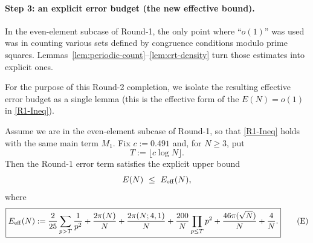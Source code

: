 \paragraph{Step 3: an explicit error budget (the new effective bound).}
In the even-element subcase of Round-1, the only point where ``$o(1)$'' was used was in counting various sets defined by congruence conditions modulo prime squares.  Lemmas~\ref{lem:periodic-count}--\ref{lem:crt-density} turn those estimates into explicit ones.

\medskip
\noindent For the purpose of this Round-2 completion, we isolate the resulting effective error budget as a single lemma (this is the effective form of the $E(N)=o(1)$ in \eqref{R1-Ineq}).

\begin{lemma}\label{lem:effective-error}
Assume we are in the even-element subcase of Round-1, so that \eqref{R1-Ineq} holds with the same main term $M_1$.
Fix $c:=0.491$ and, for $N\ge 3$, put
\[
T:=\lfloor c\log N\rfloor.
\]
Then the Round-1 error term satisfies the explicit upper bound
\[
E(N)\ \le\ E_{\rm eff}(N),
\]
where
\[
\boxed{
E_{\rm eff}(N):=
\frac{2}{25}\sum_{p>T}\frac{1}{p^2}
+\frac{2\pi(N)}{N}
+\frac{2\pi(N;4,1)}{N}
+\frac{200}{N}\prod_{p\le T}p^2
+\frac{46\pi(\sqrt N)}{N}
+\frac{4}{N}.
}
\tag{E}
\]
\end{lemma}

